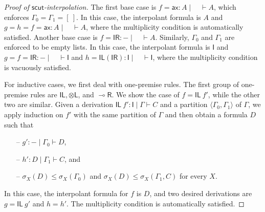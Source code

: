\documentclass[sn-mathphys-num]{sn-jnl}%
\newcommand{\GG}{\Gamma}
\newcommand{\vd}{\vdash}
\newcommand{\tl}{\otimes \mathsf{L}}
\newcommand{\unitl}{\mathsf{IL}}
\newcommand{\unitr}{\mathsf{IR}}
\newcommand{\ax}{\mathsf{ax}}
\newcommand{\lolli}{\multimap}
\newcommand{\lright}{{\lolli}\mathsf{R}}
\newcommand{\unit}{\mathsf{I}}
\newcommand{\mf}[1]{\mathsf{#1}}
\newcommand{\gs}[1]{\sigma_{X} (#1)}
\theoremstyle{thmstyleone}%
\theoremstyle{thmstyletwo}%
\theoremstyle{thmstylethree}%
\begin{document}
\begin{proof}[Proof of $\mf{scut}$-interpolation]
The first base case is $f = \ax : A \mid \quad \vd A$, which enforces $\GG_0 = \GG_1 = [\ ]$.
In this case, the interpolant formula is $A$ and $g = h = f = \ax : A \mid \quad \vd A$, where the multiplicity condition is automatically satisfied.
Another base case is $f = \unitr : {-} \mid \quad \vd A$.
Similarly, $\GG_0$ and $\GG_1$ are enforced to be empty lists.
In this case, the interpolant formula is $\unit$ and $g = f = \unitr : {-} \mid \quad \vd \unit$ and $h = \unitl (\unitr) : \unit \mid \quad \vd \unit$, where the multiplicity condition is vacuously satisfied.

For inductive cases, we first deal with one-premise rules.
The first group of one-premise rules are $\unitl, \tl$, and $\lright$.
We show the case of $f = \unitl \ f'$, while the other two are similar.
Given a derivation $\unitl \ f' : \unit \mid \GG \vd C$ and a partition $\langle \GG_0, \GG_1 \rangle$ of $\GG$, we apply induction on $f'$ with the same partition of $\GG$ and then obtain a formula $D$ such that 
\begin{itemize}
  \item[--] $g' : {-} \mid \GG_0 \vd D$,
  \item[--] $h' : D \mid \GG_1 \vd C$, and
  \item[--] $\gs{D} \leq \gs{\GG_0}$ and $\gs{D} \leq \gs{\GG_1 , C}$ for every $X$.
\end{itemize}
In this case, the interpolant formula for $f$ is $D$, and two desired derivations are $g = \unitl \ g'$ and $h = h'$.
The multiplicity condition is automatically satisfied.


\end{proof}
\end{document}
